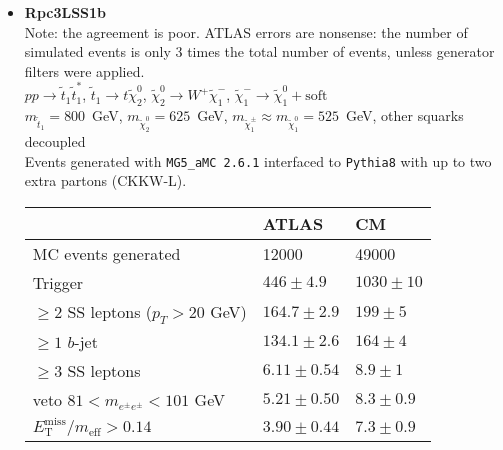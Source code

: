 \documentclass[10pt,fleqn]{article}
\newcommand{\met}{E^\mathrm{miss}_\mathrm{T}}
\newcommand{\meff}{m_\mathrm{eff}}
\begin{document}
\begin{itemize}
 \item \textbf{Rpc3LSS1b}\\ 
 Note: the agreement is poor. ATLAS errors are nonsense: the number of simulated events is only 3 times the total number of events, unless generator filters were applied.\\
 $ p p \to \tilde{t}_1 \tilde{t}_1^* $, $\tilde{t}_1 \to t \tilde{\chi}_2^0$, $\tilde{\chi}_2^0 \to W^+ \tilde{\chi}_1^- $, $\tilde{\chi}_1^- \to \tilde{\chi}_1^0 + \mathrm{soft}$ \\
 $m_{\tilde{t}_1} = 800$~GeV,  $m_{\tilde{\chi}_2^0} = 625$~GeV,  $m_{\tilde{\chi}_1^\pm} \approx m_{\tilde{\chi}_1^0} = 525$~GeV, other squarks decoupled\\
 Events generated with \texttt{MG5\_aMC 2.6.1} interfaced to \texttt{Pythia8} with up to two extra partons (CKKW-L).
 \begin{tabular}{l|p{3cm}|p{3cm}} \toprule
                                           &  ATLAS           & CM    \\ \midrule
 MC events generated                       &  12000           &  49000 \\ \midrule
 Trigger                                   & $446\pm 4.9 $    &  $1030 \pm 10$ \\
 $\geq 2$ SS leptons ($p_T > 20$ GeV)      & $164.7\pm 2.9$   &  $199  \pm 5$  \\  
 $\geq 1$ $b$-jet                          & $134.1\pm 2.6 $  &  $164  \pm 4$\\
 $\geq 3$ SS leptons                       & $6.11\pm 0.54 $  &  $8.9  \pm 1$\\ 
 veto $81 < m_{e^\pm e^\pm} < 101$ GeV     & $5.21\pm 0.50 $  &  $8.3 \pm  0.9$\\  
 $\met/\meff > 0.14$                       & $3.90\pm 0.44$   &  $7.3 \pm  0.9$\\  \bottomrule
 \end{tabular}   

 
\end{itemize}

 
\end{document}
